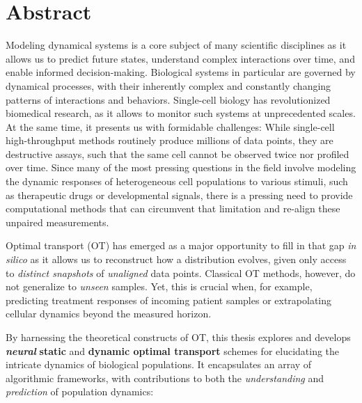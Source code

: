 \begingroup
\let\clearpage\relax
\let\cleardoublepage\relax
\let\cleardoublepage\relax

\chapter*{Abstract}

Modeling dynamical systems is a core subject of many scientific disciplines as it allows us to predict future states, understand complex interactions over time, and enable informed decision-making.
Biological systems in particular are governed by dynamical processes, with their inherently complex and constantly changing patterns of interactions and behaviors.
Single-cell biology has revolutionized biomedical research, as it allows to monitor such systems at unprecedented scales.
At the same time, it presents us with formidable challenges: While single-cell high-throughput methods routinely produce millions of data points, they are destructive assays, such that the same cell cannot be observed twice nor profiled over time.
Since many of the most pressing questions in the field involve modeling the dynamic responses of heterogeneous cell populations to various stimuli, such as therapeutic drugs or developmental signals, there is a pressing need to provide computational methods that can circumvent that limitation and re-align these unpaired measurements.

Optimal transport (OT) has emerged as a major opportunity to fill in that gap \textit{in silico} as it allows us to reconstruct how a distribution evolves, given only access to \emph{distinct snapshots} of \emph{unaligned} data points.
Classical OT methods, however, do not generalize to \emph{unseen} samples. Yet, this is crucial when, for example, predicting treatment responses of incoming patient samples or extrapolating cellular dynamics beyond the measured horizon.

By harnessing the theoretical constructs of OT, this thesis explores and develops \textbf{\emph{neural}} \textbf{static} and \textbf{dynamic optimal transport} schemes for elucidating the intricate dynamics of biological populations. It encapsulates an array of algorithmic frameworks, with contributions to both the \textit{understanding} and \textit{prediction} of population dynamics:

